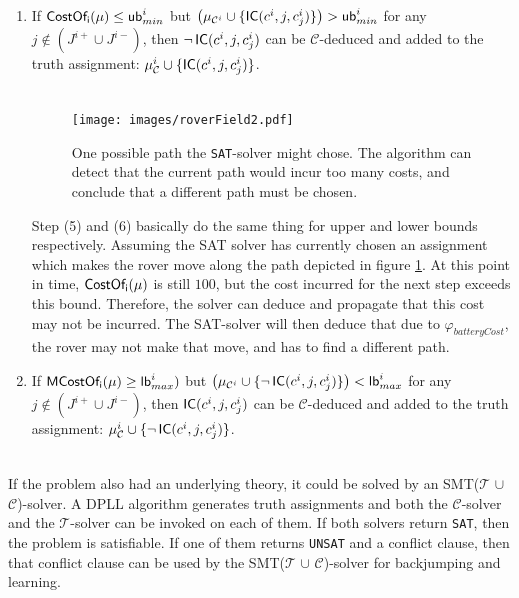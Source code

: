 \documentclass{amsart}
\theoremstyle{definition}
\theoremstyle{remark}
\numberwithin{equation}{section}
\def\T{$\mathcal{T}$}
\def\C{$\mathcal{C}$}
\def\sat{\texttt{SAT}}
\def\unsat{\texttt{UNSAT}}
\begin{document}
\begin{enumerate}[resume]
      \item If $\operatorname{\sf CostOf_i \rm}(\mu) \leq \operatorname{\sf ub \rm}_{min}^i$ but $\left(\mu_{\mathcal{C}^i} \cup \{\operatorname{\sf IC \rm}(c^i, j, c^i_j)\}\right) > \operatorname{\sf ub \rm}_{min}^i$ for any $j \not\in (J^{i+} \cup J^{i-})$, then $\neg \operatorname{\sf IC \rm}(c^i, j, c^i_j)$ can be \C{}-deduced and added to the truth assignment: $\mu_{\mathcal{C}}^i \cup \{\operatorname{\sf IC \rm}(c^i, j, c^i_j)\}$. \\\\
      \begin{figure}[!t]
        \centering
        \texttt{[image: images/roverField2.pdf]}
        \caption{One possible path the \sat{}-solver might chose. The algorithm can detect that the current path would incur too many costs, and conclude that a different path must be chosen.}
        \label{fig:roverField2}
     \end{figure}
      Step (5) and (6) basically do the same thing for upper and lower bounds respectively. Assuming the SAT solver has currently chosen an assignment which makes the rover move along the path depicted in figure \ref{fig:roverField2}. At this point in time, $\operatorname{\sf CostOf_i \rm}(\mu)$ is still $100$, but the cost incurred for the next step exceeds this bound. Therefore, the solver can deduce and propagate that this cost may not be incurred. The SAT-solver will then deduce that due to $\varphi_{batteryCost}$, the rover may not make that move, and has to find a different path. \\

      \item If $\operatorname{\sf MCostOf_i \rm}(\mu) \geq \operatorname{\sf lb \rm}_{max}^i)$ but $\left(\mu_{\mathcal{C}^i} \cup \{\neg \operatorname{\sf IC \rm}(c^i, j, c^i_j)\}\right) < \operatorname{\sf lb \rm}_{max}^i$ for any $j \not\in (J^{i+} \cup J^{i-})$, then $\operatorname{\sf IC \rm}(c^i, j, c^i_j)$ can be \C{}-deduced and added to the truth assignment: $\mu_{\mathcal{C}}^i \cup \{\neg \operatorname{\sf IC \rm}(c^i, j, c^i_j)\}$. \\\\
    \end{enumerate}

    \noindent If the problem also had an underlying theory, it could be solved by an SMT(\T{} $\cup$ \C{})-solver. A DPLL algorithm generates truth assignments and both the \C{}-solver and the \T{}-solver can be invoked on each of them. If both solvers return \sat{}, then the problem is satisfiable. If one of them returns \unsat{} and a conflict clause, then that conflict clause can be used by the SMT(\T{} $\cup$ \C{})-solver for backjumping and learning.
\end{document}
